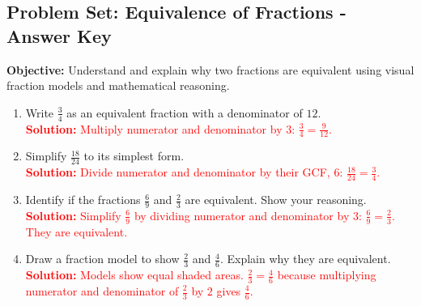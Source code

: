 \documentclass[12pt]{article}
\title{}
\date{}
\begin{document}
\subsection*{Problem Set: Equivalence of Fractions - Answer Key}
\onehalfspacing

\begin{tcolorbox}[colframe=black!40, colback=gray!5, 
coltitle=black, colbacktitle=black!20, fonttitle=\bfseries\Large, 
title=Learning Objective, halign title=center, left=5pt, right=5pt, top=5pt, bottom=15pt]
\textbf{Objective:} Understand and explain why two fractions are equivalent using visual fraction models and mathematical reasoning.
\end{tcolorbox}

\begin{tcolorbox}[colframe=black!60, colback=white, 
coltitle=black, colbacktitle=black!15, fonttitle=\bfseries\Large, 
title=Exercises, halign title=center, left=10pt, right=10pt, top=10pt, bottom=60pt]
\begin{enumerate}[itemsep=3em]
    \item Write \( \frac{3}{4} \) as an equivalent fraction with a denominator of \( 12 \).\\
    \textcolor{red}{\textbf{Solution:} Multiply numerator and denominator by \(3\): \( \frac{3}{4} = \frac{9}{12}\).}

    \item Simplify \( \frac{18}{24} \) to its simplest form.\\
    \textcolor{red}{\textbf{Solution:} Divide numerator and denominator by their GCF, \(6\): \( \frac{18}{24} = \frac{3}{4}\).}

    \item Identify if the fractions \( \frac{6}{9} \) and \( \frac{2}{3} \) are equivalent. Show your reasoning.\\
    \textcolor{red}{\textbf{Solution:} Simplify \( \frac{6}{9} \) by dividing numerator and denominator by \(3\): \( \frac{6}{9} = \frac{2}{3}\). They are equivalent.}

    \item Draw a fraction model to show \( \frac{2}{3} \) and \( \frac{4}{6} \). Explain why they are equivalent.\\
    \textcolor{red}{\textbf{Solution:} Models show equal shaded areas. \( \frac{2}{3} = \frac{4}{6}\) because multiplying numerator and denominator of \( \frac{2}{3} \) by \(2\) gives \( \frac{4}{6}\).}


\end{enumerate}
\end{tcolorbox}
\end{document}
